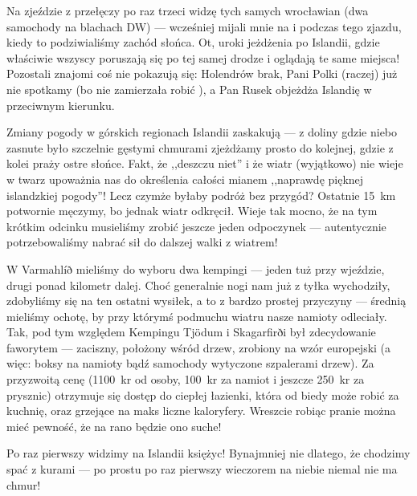 Na zjeździe z przełęczy po raz trzeci widzę tych samych wrocławian (dwa samochody na blachach DW) --- wcześniej mijali mnie na  i podczas tego zjazdu, kiedy to podziwialiśmy zachód słońca. Ot, uroki jeżdżenia po Islandii, gdzie właściwie wszyscy poruszają się po tej samej drodze i oglądają te same miejsca! Pozostali znajomi coś nie pokazują się: Holendrów brak, Pani Polki (raczej) już nie spotkamy (bo nie zamierzała robić ), a Pan Rusek objeżdża Islandię w przeciwnym kierunku.

Zmiany pogody w górskich regionach Islandii zaskakują --- z doliny gdzie niebo zasnute było szczelnie gęstymi chmurami zjeżdżamy prosto do kolejnej, gdzie z kolei praży ostre słońce. Fakt, że ,,deszczu niet'' i że wiatr (wyjątkowo) nie wieje w twarz upoważnia nas do określenia całości mianem ,,naprawdę pięknej islandzkiej pogody''! Lecz czymże byłaby podróż bez przygód? Ostatnie 15~km potwornie męczymy, bo jednak wiatr odkręcił. Wieje tak mocno, że na tym krótkim odcinku musieliśmy zrobić jeszcze jeden odpoczynek --- autentycznie potrzebowaliśmy nabrać sił do dalszej walki z wiatrem!

W Varmahlíð mieliśmy do wyboru dwa kempingi --- jeden tuż przy wjeździe, drugi ponad kilometr dalej. Choć generalnie nogi nam już z tyłka wychodziły, zdobyliśmy się na ten ostatni wysiłek, a to z bardzo prostej przyczyny --- średnią mieliśmy ochotę, by przy którymś podmuchu wiatru nasze namioty odleciały. Tak, pod tym względem Kempingu Tjödum i Skagarfirði był zdecydowanie faworytem --- zaciszny, położony wśród drzew, zrobiony na wzór europejski (a więc: boksy na namioty bądź samochody wytyczone szpalerami drzew). Za przyzwoitą cenę (1100~kr od osoby, 100~kr za namiot i jeszcze 250~kr za prysznic) otrzymuje się dostęp do ciepłej łazienki, która od biedy może robić za kuchnię, oraz grzejące na maks liczne kaloryfery. Wreszcie robiąc pranie można mieć pewność, że na rano będzie ono suche!

Po raz pierwszy widzimy na Islandii księżyc! Bynajmniej nie dlatego, że chodzimy spać z kurami --- po prostu po raz pierwszy wieczorem na niebie niemal nie ma chmur!
